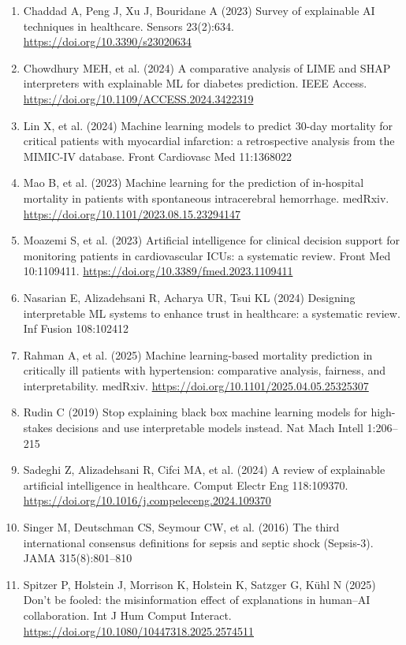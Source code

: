 \documentclass[12pt,a4paper]{report}
\begin{document}
\begin{enumerate}
  \item Chaddad A, Peng J, Xu J, Bouridane A (2023) Survey of explainable AI techniques in healthcare. Sensors 23(2):634. \url{https://doi.org/10.3390/s23020634}
  \item Chowdhury MEH, et al. (2024) A comparative analysis of LIME and SHAP interpreters with explainable ML for diabetes prediction. IEEE Access. \url{https://doi.org/10.1109/ACCESS.2024.3422319}
  \item Lin X, et al. (2024) Machine learning models to predict 30-day mortality for critical patients with myocardial infarction: a retrospective analysis from the MIMIC-IV database. Front Cardiovasc Med 11:1368022
  \item Mao B, et al. (2023) Machine learning for the prediction of in-hospital mortality in patients with spontaneous intracerebral hemorrhage. medRxiv. \url{https://doi.org/10.1101/2023.08.15.23294147}
  \item Moazemi S, et al. (2023) Artificial intelligence for clinical decision support for monitoring patients in cardiovascular ICUs: a systematic review. Front Med 10:1109411. \url{https://doi.org/10.3389/fmed.2023.1109411}
  \item Nasarian E, Alizadehsani R, Acharya UR, Tsui KL (2024) Designing interpretable ML systems to enhance trust in healthcare: a systematic review. Inf Fusion 108:102412
  \item Rahman A, et al. (2025) Machine learning-based mortality prediction in critically ill patients with hypertension: comparative analysis, fairness, and interpretability. medRxiv. \url{https://doi.org/10.1101/2025.04.05.25325307}
  \item Rudin C (2019) Stop explaining black box machine learning models for high-stakes decisions and use interpretable models instead. Nat Mach Intell 1:206--215
  \item Sadeghi Z, Alizadehsani R, Cifci MA, et al. (2024) A review of explainable artificial intelligence in healthcare. Comput Electr Eng 118:109370. \url{https://doi.org/10.1016/j.compeleceng.2024.109370}
  \item Singer M, Deutschman CS, Seymour CW, et al. (2016) The third international consensus definitions for sepsis and septic shock (Sepsis-3). JAMA 315(8):801--810
  \item Spitzer P, Holstein J, Morrison K, Holstein K, Satzger G, Kühl N (2025) Don't be fooled: the misinformation effect of explanations in human--AI collaboration. Int J Hum Comput Interact. \url{https://doi.org/10.1080/10447318.2025.2574511}

\end{enumerate}
\end{document}
